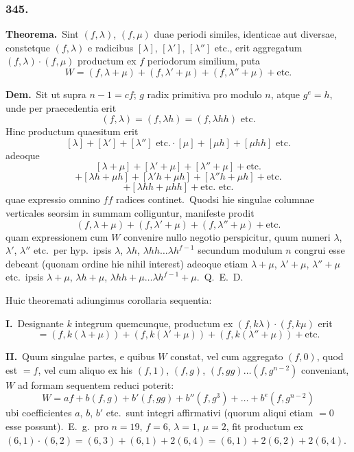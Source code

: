 \documentclass[12pt,a4paper]{article}
\theoremstyle{plain}
\theoremstyle{definition}
\theoremstyle{remark}
\begin{document}
\subsubsection*{345.}

\textbf{Theorema.}\ Sint $(f,\lambda)$, $(f,\mu)$ duae periodi similes, identicae aut
diversae, constetque $(f,\lambda)$ e radicibus $[\lambda]$, $[\lambda']$, $[\lambda'']$ etc., erit
aggregatum $(f,\lambda)\cdot(f,\mu)$ productum ex $f$ periodorum similium, puta
\[W = (f,\lambda+\mu) + (f,\lambda'+\mu) + (f,\lambda''+\mu) + \text{etc.}\]

\textbf{Dem.}\ Sit ut supra $n-1=cf$; $g$ radix primitiva pro modulo $n$,
atque $g^e=h$, unde per praecedentia erit
\[(f,\lambda) = (f,\lambda h) = (f,\lambda hh)\text{ etc.}\]
Hinc productum quaesitum erit
\[[\lambda]+[\lambda']+[\lambda'']\text{ etc.}\cdot[\mu]+[\mu h]+[\mu hh]\text{ etc.}\]
adeoque
\[[\lambda+\mu]+[\lambda'+\mu]+[\lambda''+\mu]+\text{etc.}\]
\[+ [\lambda h+\mu h]+[\lambda'h+\mu h]+[\lambda''h+\mu h]+\text{etc.}\]
\[+ [\lambda hh+\mu hh]+\text{etc. etc.}\]
quae expressio omnino $ff$ radices continet.\ Quodsi hie singulae columnae
verticales seorsim in summam colliguntur, manifeste prodit
\[(f,\lambda+\mu)+(f,\lambda'+\mu)+(f,\lambda''+\mu)+\text{etc.}\]
quam expressionem cum $W$ convenire nullo negotio perspicitur, quum
numeri $\lambda$, $\lambda'$, $\lambda''$ etc.\ per hyp.\ ipsis $\lambda$, $\lambda h$, $\lambda hh\dots\lambda h^{f-1}$
secundum modulum $n$ congrui esse debeant (quonam ordine hie nihil
interest) adeoque etiam $\lambda+\mu$, $\lambda'+\mu$, $\lambda''+\mu$ etc.\ ipsis
$\lambda+\mu$, $\lambda h+\mu$, $\lambda hh+\mu\dots\lambda h^{f-1}+\mu$.\ Q.\ E.\ D.

Huic theoremati adiungimus corollaria sequentia:

\textbf{I.}\ Designante $k$ integrum quemcunque, productum ex
$(f,k\lambda)\cdot(f,k\mu)$ erit
\[=(f,k(\lambda+\mu))+(f,k(\lambda'+\mu))+(f,k(\lambda''+\mu))+\text{etc.}\]

\textbf{II.}\ Quum singulae partes, e quibus $W$ constat, vel cum aggregato
$(f,0)$, quod est $=f$, vel cum aliquo ex his $(f,1)$, $(f,g)$, $(f,gg)\dots(f,g^{n-2})$
conveniant, $W$ ad formam sequentem reduci poterit:
\[W = af+b(f,g)+b'(f,gg)+b''(f,g^3)+\dots+b^e(f,g^{n-2})\]
ubi coefficientes $a$, $b$, $b'$ etc.\ sunt integri affirmativi (quorum aliqui
etiam $=0$ esse possunt).\ E.\ g.\ pro $n=19$, $f=6$, $\lambda=1$, $\mu=2$,
fit productum ex $(6,1)\cdot(6,2) = (6,3)+(6,1)+2(6,4) = (6,1)+2(6,2)+2(6,4)$.
\end{document}
